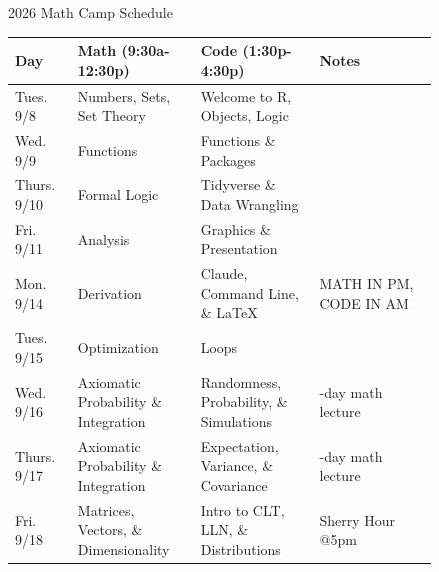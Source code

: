 \documentclass[11pt]{article}
\newcommand{\colWidthOne}  {0.12}   %
\newcommand{\colWidthTwo}  {0.24}
\newcommand{\colWidthThree}{0.24}
\newcommand{\colWidthFour} {0.24}
\begin{document}
\thispagestyle{empty}
\begin{center}

  \Large
  2026 Math Camp Schedule

\begin{table}[htbp]
  \centering
  \begin{tabular}{
      | >{\raggedright\arraybackslash}m{\colWidthOne\linewidth}
      | >{\raggedright\arraybackslash}m{\colWidthTwo\linewidth}
      | >{\raggedright\arraybackslash}m{\colWidthThree\linewidth}
      | >{\raggedright\arraybackslash}m{\colWidthFour\linewidth} |
    }
    \hline
    \rowcolor{gray!25}
    \textbf{Day} & \textbf{Math} (9:30a-12:30p) & \textbf{Code} (1:30p-4:30p) & \textbf{Notes} \\
    \hline
    Tues. 9/8  & Numbers, Sets, Set Theory &    Welcome to R, Objects, Logic       &        \\
    \hline
    Wed. 9/9 &  Functions          &  Functions \& Packages         &                  \\
    \hline
    Thurs. 9/10 & Formal Logic  & Tidyverse \& Data Wrangling           &            \\
    \hline
    Fri. 9/11 & Analysis      & Graphics \& Presentation               &             \\
    \hline
    Mon. 9/14  & Derivation      &    Claude, Command Line, \& \LaTeX                 & \cellcolor{highlight} MATH IN PM, CODE IN AM \\
    \hline
    Tues. 9/15  & Optimization & Loops           &        \\
    \hline
    Wed. 9/16  & \cellcolor{gray!15}Axiomatic Probability \& Integration  & Randomness, Probability, \& Simulations & 2-day math lecture   \\
    \hline
    Thurs. 9/17  & \cellcolor{gray!15}Axiomatic Probability \& Integration    & Expectation, Variance, \& Covariance             & 2-day math lecture         \\ 
    \hline
    Fri. 9/18 & Matrices, Vectors, \& Dimensionality & Intro to CLT, LLN, \& Distributions & Sherry Hour @5pm \\
    \hline 
  \end{tabular}
\end{table}

\end{center}
\end{document}
